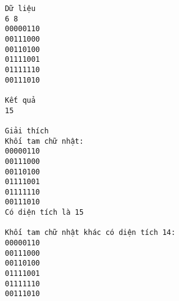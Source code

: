 \begin{verbatim}
Dữ liệu
6 8
00000110
00111000
00110100
01111001
01111110
00111010

Kết quả
15

Giải thích
Khối tam chữ nhật:
00000110
00111000
00110100
01111001
01111110
00111010  
Có diện tích là 15

Khối tam chữ nhật khác có diện tích 14:
00000110
00111000
00110100
01111001
01111110
00111010 
\end{verbatim}